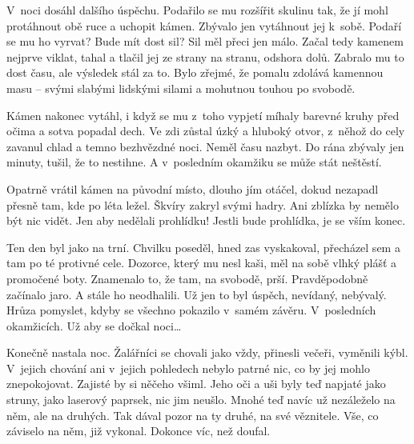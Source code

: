 V noci dosáhl dalšího úspěchu. Podařilo se mu rozšířit skulinu tak, že jí mohl protáhnout obě ruce a uchopit kámen. Zbývalo jen vytáhnout jej k sobě. Podaří se mu ho vyrvat? Bude mít dost sil? Sil měl přeci jen málo. Začal tedy kamenem nejprve viklat, tahal a tlačil jej ze strany na stranu, odshora dolů. Zabralo mu to dost času, ale výsledek stál za to. Bylo zřejmé, že pomalu zdolává kamennou masu -- svými slabými lidskými silami a mohutnou touhou po svobodě.

Kámen nakonec vytáhl, i když se mu z toho vypjetí míhaly barevné kruhy před očima a sotva popadal dech. Ve zdi zůstal úzký a hluboký otvor, z něhož do cely zavanul chlad a temno bezhvězdné noci. Neměl času nazbyt. Do rána zbývaly jen minuty, tušil, že to nestihne. A v posledním okamžiku se může stát neštěstí.

Opatrně vrátil kámen na původní místo, dlouho jím otáčel, dokud nezapadl přesně tam, kde po léta ležel. Škvíry zakryl svými hadry. Ani zblízka by nemělo být nic vidět. Jen aby nedělali prohlídku! Jestli bude prohlídka, je se vším konec.

Ten den byl jako na trní. Chvilku poseděl, hned zas vyskakoval, přecházel sem a tam po té protivné cele. Dozorce, který mu nesl kaši, měl na sobě vlhký plášť a promočené boty. Znamenalo to, že tam, na svobodě, prší. Pravděpodobně začínalo jaro. A stále ho neodhalili. Už jen to byl úspěch, nevídaný, nebývalý. Hrůza pomyslet, kdyby se všechno pokazilo v samém závěru. V posledních okamžicích. Už aby se dočkal noci\ldots

Konečně nastala noc. Žalářníci se chovali jako vždy, přinesli večeři, vyměnili kýbl. V jejich chování ani v jejich pohledech nebylo patrné nic, co by jej mohlo znepokojovat. Zajisté by si něčeho všiml. Jeho oči a uši byly teď napjaté jako struny, jako laserový paprsek, nic jim neušlo. Mnohé teď navíc už nezáleželo na něm, ale na druhých. Tak dával pozor na ty druhé, na své věznitele. Vše, co záviselo na něm, již vykonal. Dokonce víc, než doufal.


